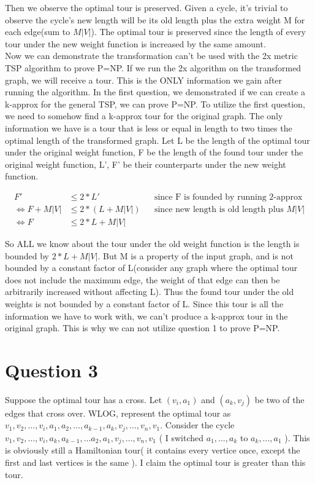\documentclass{article}
\begin{document}
    Then we observe the optimal tour is preserved. Given a cycle, it's trivial to observe the cycle's
    new length will be its old length plus the extra weight M for each edge(sum to $M|V|$). The optimal
    tour is preserved since the length of every tour under the new weight function is increased by
    the same amount. \\


    Now we can demonstrate the transformation can't be used with the 2x metric TSP algorithm to prove P=NP.
    If we run the 2x algorithm on the transformed graph, we will receive a tour. This is the ONLY
    information we gain after running the algorithm. In the first question, we demonstrated if we can create
    a k-approx for the general TSP, we can prove P=NP. To utilize the first question, we need to somehow find
    a k-approx tour for the original graph. The only information we have is a tour that is less or equal in length
    to two times the optimal length of the transformed graph. Let L be the length of the optimal tour under the original
    weight function, F be the length of the found tour under the original weight function, L', F' be their counterparts 
    under the new weight function.

    \begin{align*}
        F' &\le 2*L'    && \text{since F is founded by running 2-approx} \\
        \Leftrightarrow F+M|V| &\le 2*(L+M|V|) && \text{since new length is old length plus $M|V|$} \\
        \Leftrightarrow F &\le 2*L + M|V|
    \end{align*}

    So ALL we know about the tour under the old weight function is the length is bounded
    by $2*L+M|V|$. But M is a property of the input graph, and is not bounded by a constant
    factor of L(consider any graph where the optimal tour does not include the maximum edge,
    the weight of that edge can then be arbitrarily increased without affecting L). 
    Thus the found tour under the old weights is not bounded by a constant factor of L.
    Since this tour is all the information we have to work with, we can't produce a k-approx tour
    in the original graph. This is why we can not utilize question 1 to prove P=NP.

\section*{Question 3}
    Suppose the optimal tour has a cross. Let $(v_i,a_1)$ and $(a_k,v_j)$ be two of the edges that cross over. 
    WLOG, represent the optimal tour as $v_1, v_2, \dots, v_i, a_1, a_2, \dots, a_{k-1}, a_k, v_j, \dots, v_n, v_1.$ 
    Consider the cycle \\
    $v_1, v_2, \dots, v_i, a_k, a_{k-1}, \dots a_2, a_1, v_j, \dots, v_n, v_1$ 
    ( I switched $a_1,..., a_k$ to $a_k,...,a_1$ ).  This is obviously still a Hamiltonian tour( 
    it contains every vertice once, except the first and last vertices is the same ). 
    I claim the optimal tour is greater than this tour. \\
\end{document}

